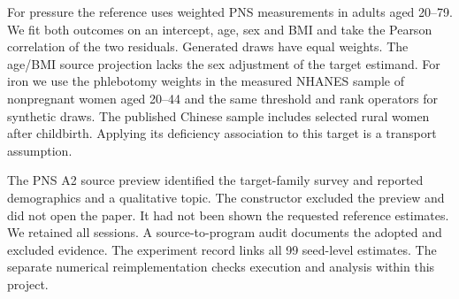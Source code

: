 \documentclass[sigconf,anonymous,nonacm]{acmart}
\begin{document}
For pressure the reference uses weighted PNS measurements in adults aged 20–\allowbreak{}79. We fit both outcomes on an intercept, age, sex and BMI and take the Pearson correlation of the two residuals. Generated draws have equal weights. The age/\allowbreak{}BMI source projection lacks the sex adjustment of the target estimand. For iron we use the phlebotomy weights in the measured NHANES sample of nonpregnant women aged 20–\allowbreak{}44 and the same threshold and rank operators for synthetic draws. The published Chinese sample includes selected rural women after childbirth. Applying its deficiency association to this target is a transport assumption.


The PNS A2 source preview identified the target-family survey and reported demographics and a qualitative topic. The constructor excluded the preview and did not open the paper. It had not been shown the requested reference estimates. We retained all sessions. A source-to-program audit documents the adopted and excluded evidence. The experiment record links all 99 seed-level estimates. The separate numerical reimplementation checks execution and analysis within this project.
\end{document}
